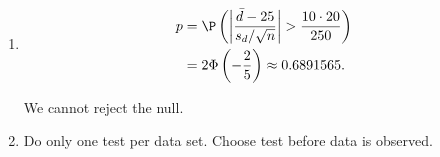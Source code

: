 \begin{solution}
\begin{enumerate}[label = (\alph*)]
    \item 

    \begin{align*}
        p &= \P\left( \left|\frac{\bar{d} - 25}{s_d/\sqrt{n}}\right| > \frac{10 \cdot 20}{250} \right) \\
        &= 2\Phi\left(-\frac{2}{5}\right) \approx 0.6891565.
    \end{align*}

    We cannot reject the null.

    \item Do only one test per data set. Choose test before data is observed.

\end{enumerate}

\end{solution}

